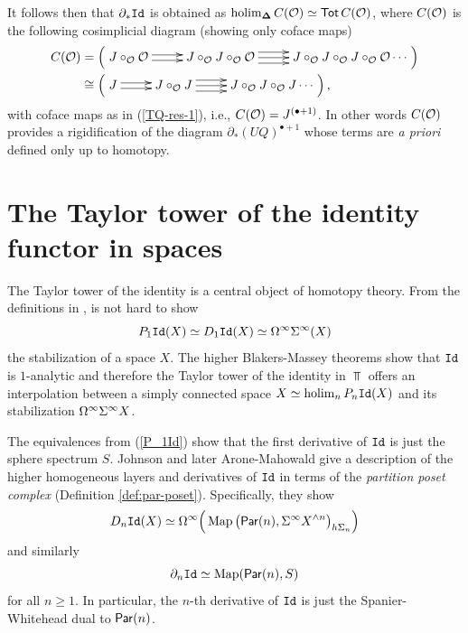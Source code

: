 \begin{remark} \label{prop:der_n-model-equivs} It follows then that $\partial_* \mathtt{Id}$ is obtained as $\operatorname{holim}_{\mathbf{\Delta}} C(\mathcal{O})\simeq \operatorname{\mathsf{Tot}} C(\mathcal{O})$, where $C(\mathcal{O})$ is the following cosimplicial diagram (showing only coface maps)\begin{align} \label{al:CO}
    C(\Cal{O}) &= \left( \xymatrix{
    J\circ_{\Cal{O}} \Cal{O} \ar@<-.5ex>[r] \ar@<.5ex>[r] &
    J\circ_{\Cal{O}} J\circ_{\Cal{O}}\Cal{O} \ar@<-1ex>[r] \ar[r] \ar@<1ex>[r] & 
    J\circ_{\Cal{O}} J\circ_{\Cal{O}} J\circ_{\Cal{O}}\Cal{O} \cdots
    }\right) 
    \\
    & \cong \left( \xymatrix{
    J \ar@<-.5ex>[r] \ar@<.5ex>[r] &
    J\circ_{\Cal{O}} J \ar@<-1ex>[r] \ar[r] \ar@<1ex>[r] & 
    J\circ_{\Cal{O}} J\circ_{\Cal{O}} J\cdots
    }\right), \nonumber
\end{align}
with coface maps as in (\ref{TQ-res-1}), i.e., $C(\mathcal{O})= J^{(\bullet+1)}$. In other words $C(\mathcal{O})$ provides a rigidification of the diagram $\partial_* (UQ)^{\bullet+1}$ whose terms are \textit{a priori} defined only up to homotopy.
\end{remark} 

\section{The Taylor tower of the identity functor in spaces} 
The Taylor tower of the identity is a central object of homotopy theory. From the definitions in \cite{Goo-Calc3}, is not hard to show \begin{equation} \label{P_1Id}
    P_1\mathtt{Id}(X)\simeq D_1\mathtt{Id}(X)\simeq \Omega^{\infty} \Sigma^{\infty} (X)
    \end{equation}
the stabilization of a space $X$. The higher Blakers-Massey theorems \cite[2.1]{Goo-Calc2} show that $\mathtt{Id}$ is $1$-analytic and therefore the Taylor tower of the identity in $\Top$ offers an interpolation between a simply connected space $X\simeq \operatorname{holim}_n P_n\mathtt{Id}(X)$ and its stabilization $\Omega^{\infty} \Sigma^{\infty} X$. 

The equivalences from (\ref{P_1Id}) show that the first derivative of $\mathtt{Id}$ is just the sphere spectrum $S$. Johnson \cite{Joh} and later Arone-Mahowald \cite{Ar-Mah} give a description of the higher homogeneous layers and derivatives of $\mathtt{Id}$ in terms of the\textit{ partition poset complex} (Definition \ref{def:par-poset}). Specifically, they show 
\begin{equation} \label{D_n I}
    D_n \mathtt{Id} (X)\simeq \Omega^{\infty}\Big( \operatorname{Map} \big(\mathsf{Par}(n), \Sigma^{\infty} X^{\wedge n}\big)_{h \Sigma_n}\Big)
\end{equation}
and similarly \begin{equation} \label{der_n I}\partial_n \mathtt{Id}\simeq \operatorname{Map}( \mathsf{Par}(n), S)\end{equation}
for all $n\geq 1$. In particular, the $n$-th derivative of $\mathtt{Id}$ is just the Spanier-Whitehead dual to $\mathsf{Par}(n)$.



